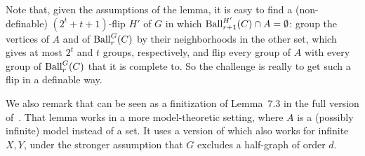 \lemBallFlip*




Note that, given the assumptions of the lemma, it is easy to find a (non-definable) $(2^t+t+1)$-flip $H'$ of $G$ in which $\operatorname{Ball}_{r+1}^{H'}(C) \cap A = \emptyset$: group the vertices of $A$ and of $\operatorname{Ball}_r^G(C)$ by their neighborhoods in the other set, which gives at most $2^t$ and $t$ groups, respectively, and flip every group of $A$ with every group of $\operatorname{Ball}_r^G(C)$ that it is complete to.
So the challenge is really to get such a flip in a definable way.

We also remark that  can be seen as a finitization of Lemma~7.3 in the full version of~\cite{flippers}.
That lemma works in a more model-theoretic setting, where $A$ is a (possibly infinite) model instead of a set.
It uses a version of  which also works for infinite $X,Y$, under the stronger 
assumption that $G$ excludes a half-graph of order $d$.

